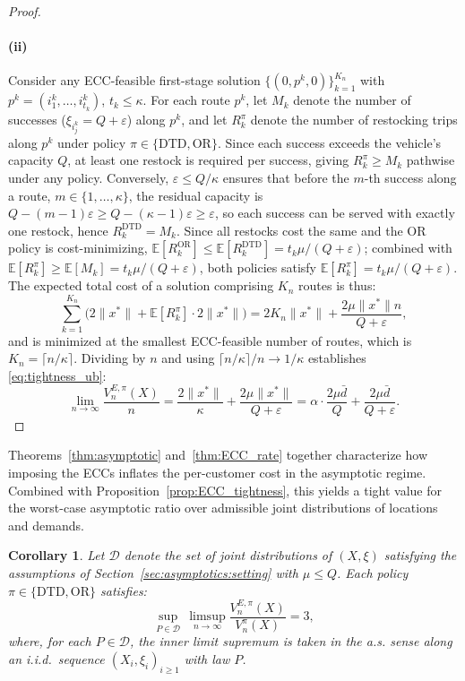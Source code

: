 \documentclass{article}
\newtheorem{corollary}{Corollary}
\begin{document}
{\begin{proof}
    \paragraph{(ii)} Consider any ECC-feasible first-stage solution $\{(0, p^k, 0)\}_{k=1}^{K_n}$ with $p^k = (i^k_1, \dots, i^k_{t_k})$, $t_k \leq \kappa$. For each route $p^k$, let $M_k$ denote the number of successes ($\xi_{i^k_j} = Q+\varepsilon$) along $p^k$, and let $R^\pi_k$ denote the number of restocking trips along $p^k$ under policy $\pi \in \{\text{DTD}, \text{OR}\}$. Since each success exceeds the vehicle's capacity $Q$, at least one restock is required per success, giving $R^\pi_k \geq M_k$ pathwise under any policy. Conversely, $\varepsilon \leq Q/\kappa$ ensures that before the $m$-th success along a route, $m \in \{1,\dots, \kappa\}$, the residual capacity is $Q - (m-1)\varepsilon \geq Q - (\kappa-1)\varepsilon \geq \varepsilon$, so each success can be served with exactly one restock, hence $R^{\text{DTD}}_k = M_k$. Since all restocks cost the same and the OR policy is cost-minimizing, $\mathbb{E}[R^{\text{OR}}_k] \leq \mathbb{E}[R^{\text{DTD}}_k] = t_k \mu/(Q+\varepsilon)$; combined with $\mathbb{E}[R^\pi_k] \geq \mathbb{E}[M_k] = t_k \mu/(Q+\varepsilon)$, both policies satisfy $\mathbb{E}[R^\pi_k] = t_k \mu/(Q+\varepsilon)$. The expected total cost of a solution comprising $K_n$ routes is thus:
\[
    \sum_{k=1}^{K_n} \bigl(2\|x^*\| + \mathbb{E}[R^\pi_k] \cdot 2\|x^*\|\bigr) = 2 K_n \|x^*\| + \frac{2\mu \|x^*\| n}{Q+\varepsilon},
\]
and is minimized at the smallest ECC-feasible number of routes, which is $K_n = \lceil n/\kappa \rceil$. Dividing by $n$ and using $\lceil n/\kappa \rceil/n \to 1/\kappa$ establishes \eqref{eq:tightness_ub}:
\[
    \lim_{n \to \infty} \frac{V^{E, \pi}_n(X)}{n} = \frac{2\|x^*\|}{\kappa} + \frac{2\mu\|x^*\|}{Q+\varepsilon} = \alpha \cdot \frac{2\mu\bar d}{Q} + \frac{2\mu\bar d}{Q+\varepsilon}.
\]
\end{proof}

Theorems~\ref{thm:asymptotic} and~\ref{thm:ECC_rate} together characterize how imposing the ECCs inflates the per-customer cost in the asymptotic regime. Combined with Proposition~\ref{prop:ECC_tightness}, this yields a tight value for the worst-case asymptotic ratio over admissible joint distributions of locations and demands.

\begin{corollary}\label{cor:ECC_worst_case}
Let $\mathcal{D}$ denote the set of joint distributions of $(X,\xi)$ satisfying the assumptions of Section~\ref{sec:asymptotics:setting} with $\mu \leq Q$. Each policy $\pi \in \{\text{DTD}, \text{OR}\}$ satisfies:
\begin{equation}\label{eq:ECC_worst_case}
    \sup_{P \in \mathcal{D}} \, \limsup_{n \to \infty} \frac{V^{E,\pi}_n(X)}{V^\pi_n(X)} = 3,
\end{equation}
where, for each $P \in \mathcal{D}$, the inner limit supremum is taken in the a.s. sense along an i.i.d.\ sequence $(X_i,\xi_i)_{i\geq1}$ with law $P$.
\end{corollary}

}
\end{document}

